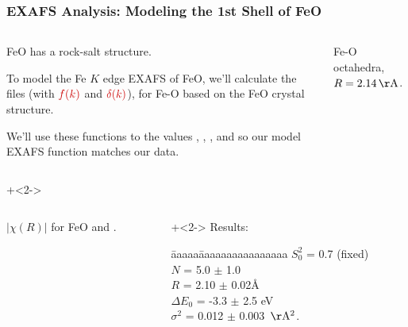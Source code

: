 \begin{frame}
\frametitle{EXAFS Analysis: Modeling the 1st Shell of FeO}

    \begin{columns}
      \begin{column}{80mm}
        FeO has a rock-salt structure.
        \vmm\vmm

        To model the Fe $K$ edge EXAFS of FeO, we'll calculate the
        {} files (with ${{\Red{f(k)}}}$ and
        ${{\Red{\delta(k)}}}$), for Fe-O based on the FeO crystal
        structure.

        \vmm

        We'll use these functions to {} the values
        {}, {},
        {}, and {} so our
        model EXAFS function matches our data.
        \vspace{2mm}

      \end{column}
      \begin{column}{25mm}


         Fe-O octahedra, ${R=2.14\rm\,\AA}$.

    \end{column}
    \end{columns}

    \onslide+<2->

    \begin{columns}
     \begin{column}{65mm} {}
        ${|\chi(R)|}$ for FeO {} and {}.
      \end{column}
      \begin{column}{35mm}\onslide+<2->
        \setlength{\baselineskip}{10pt} \vmm
        Results:   \vmm
        \begin{tabbing}[ll]\= aaaaa\= aaaaaaaaaaaaaaaa\kill
          \> ${S_0^2}$     \>= 0.7 (fixed)\\
          \> ${N}$           \>= 5.0 ${\pm}$ 1.0\\
          \> ${R}$           \>= 2.10 ${\pm}$ 0.02\AA\\
          \> ${\Delta E_0}$ \>= -3.3 ${\pm}$ 2.5 eV\\
          \> ${\sigma^2}$   \>= 0.012 ${\pm}$ 0.003
          ${\rm\,\AA^2}$.\\
          \end{tabbing}

        \vfill
    \end{column}
  \end{columns}

\vfill
\end{frame}

